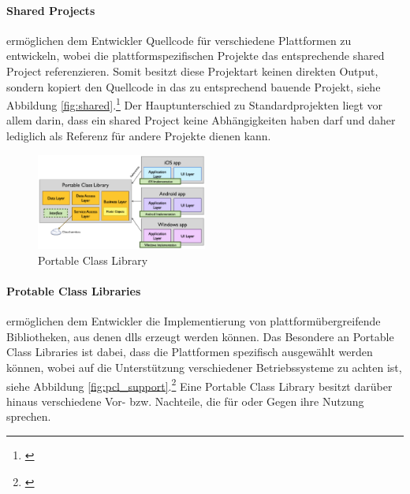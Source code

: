 \paragraph{Shared Projects}

ermöglichen dem Entwickler Quellcode für verschiedene Plattformen zu entwickeln, wobei die plattformspezifischen Projekte das entsprechende shared Project referenzieren. Somit besitzt diese Projektart keinen direkten Output, sondern kopiert den Quellcode in das zu entsprechend bauende Projekt, siehe Abbildung \eqref{fig:shared}.\footnote{\citep[vgl.][Shared Projects - Xamarin]{Xamarin.SharedProjects}\label{note4}} Der Hauptunterschied zu Standardprojekten liegt vor allem darin, dass ein shared Project keine Abhängigkeiten haben darf und daher lediglich als Referenz für andere Projekte dienen kann.

\begin{figure}
	\begin{center}
		\includegraphics[width=0.5\textwidth]{images/technische_grundlagen/PortableClassLibrary.png}
	\end{center}
	\caption{Portable Class Library}
	\label{fig:portable}
\end{figure}

\paragraph{Protable Class Libraries}

ermöglichen dem Entwickler die Implementierung von plattformübergreifende Bibliotheken, aus denen \glspl{dll} erzeugt werden können. Das Besondere an Portable Class Libraries ist dabei, dass die Plattformen spezifisch ausgewählt werden können, wobei auf die Unterstützung verschiedener Betriebssysteme zu achten ist, siehe Abbildung \eqref{fig:pcl_support}.\footnote{\citep[vgl.][Introduction to Portable Class Libraries - Xamarin]{Xamarin.PortableClass}\label{note5}} Eine Portable Class Library besitzt darüber hinaus verschiedene Vor- bzw. Nachteile, die für oder Gegen ihre Nutzung sprechen.\\

